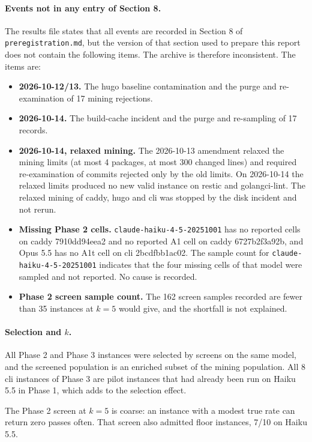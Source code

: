\paragraph{Events not in any entry of Section 8.} The results file states that all events are recorded in Section 8 of \texttt{preregistration.md}, but the version of that section used to prepare this report does not contain the following items. The archive is therefore inconsistent. The items are:
\begin{itemize}
\item \textbf{2026-10-12/13.} The hugo baseline contamination and the purge and re-examination of 17 mining rejections.
\item \textbf{2026-10-14.} The build-cache incident and the purge and re-sampling of 17 records.
\item \textbf{2026-10-14, relaxed mining.} The 2026-10-13 amendment relaxed the mining limits (at most 4 packages, at most 300 changed lines) and required re-examination of commits rejected only by the old limits. On 2026-10-14 the relaxed limits produced no new valid instance on restic and golangci-lint. The relaxed mining of caddy, hugo and cli was stopped by the disk incident and not rerun.
\item \textbf{Missing Phase 2 cells.} \texttt{claude-haiku-4-5-20251001} has no reported cells on caddy 7910dd94eea2 and no reported A1 cell on caddy 6727b2f3a92b, and Opus 5.5 has no A1t cell on cli 2bcdfbb1ac02. The sample count for \texttt{claude-haiku-4-5-20251001} indicates that the four missing cells of that model were sampled and not reported. No cause is recorded.
\item \textbf{Phase 2 screen sample count.} The 162 screen samples recorded are fewer than 35 instances at $k=5$ would give, and the shortfall is not explained.
\end{itemize}

\paragraph{Selection and $k$.} All Phase 2 and Phase 3 instances were selected by screens on the same model, and the screened population is an enriched subset of the mining population. All 8 cli instances of Phase 3 are pilot instances that had already been run on Haiku 5.5 in Phase 1, which adds to the selection effect.

The Phase 2 screen at $k=5$ is coarse: an instance with a modest true rate can return zero passes often. That screen also admitted floor instances, 7/10 on Haiku 5.5.

